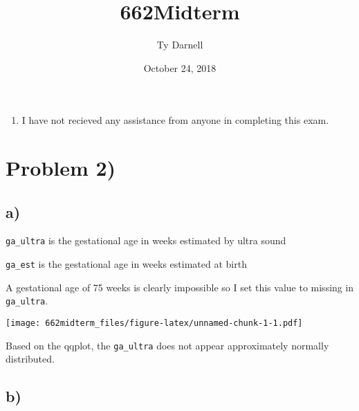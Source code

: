 \documentclass[]{article}
\title{662Midterm}
\author{Ty Darnell}
\date{October 24, 2018}
\newenvironment{Shaded}{\begin{snugshade}}{\end{snugshade}}
\newcommand{\KeywordTok}[1]{\textcolor[rgb]{0.13,0.29,0.53}{\textbf{#1}}}
\newcommand{\DataTypeTok}[1]{\textcolor[rgb]{0.13,0.29,0.53}{#1}}
\newcommand{\DecValTok}[1]{\textcolor[rgb]{0.00,0.00,0.81}{#1}}
\newcommand{\OtherTok}[1]{\textcolor[rgb]{0.56,0.35,0.01}{#1}}
\newcommand{\OperatorTok}[1]{\textcolor[rgb]{0.81,0.36,0.00}{\textbf{#1}}}
\newcommand{\NormalTok}[1]{#1}
\providecommand{\tightlist}{%
  \setlength{\itemsep}{0pt}\setlength{\parskip}{0pt}}
\begin{document}
\maketitle

\begin{enumerate}
\def\labelenumi{\arabic{enumi})}
\tightlist
\item
  I have not recieved any assistance from anyone in completing this
  exam.
\end{enumerate}

\section{Problem 2)}\label{problem-2}

\subsection{a)}\label{a}

\texttt{ga\_ultra} is the gestational age in weeks estimated by ultra
sound

\texttt{ga\_est} is the gestational age in weeks estimated at birth

A gestational age of 75 weeks is clearly impossible so I set this value
to missing in \texttt{ga\_ultra}.

\begin{Shaded}
\end{Shaded}

\texttt{[image: 662midterm\_files/figure-latex/unnamed-chunk-1-1.pdf]}

Based on the qqplot, the \texttt{ga\_ultra} does not appear
approximately normally distributed.

\subsection{b)}\label{b}

\begin{Shaded}
\end{Shaded}
\end{document}
